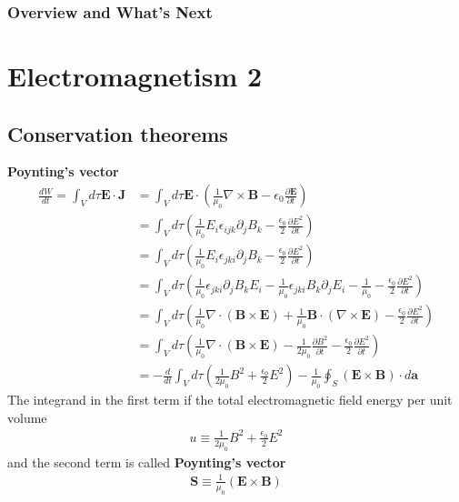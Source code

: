\documentclass[a4paper]{article}
\begin{document}
    \subsubsection{Overview and What's Next}

    \section{Electromagnetism 2}
    \subsection{Conservation theorems}

    \textbf{Poynting's vector} 
    \begin{align*}
        \frac{dW}{dt} = \int_V d \tau \mathbf{E} \cdot \mathbf{J} &= \int_V d \tau \mathbf{E} \cdot \left( \frac{1}{\mu_0} \nabla \times \mathbf{B} - \epsilon_0 \frac{\partial \mathbf{E}}{\partial t}\right) \\
        &= \int _V d \tau \left( \frac{1}{\mu _0} E_i \epsilon_{ijk} \partial_j B_k - \frac{\epsilon_0}{2} \frac{\partial E^{2} }{\partial t} \right) \\
        &= \int _V d \tau \left( \frac{1}{\mu _0}E_i\epsilon _{jki}\partial _j B_k  -  \frac{\epsilon_0}{2} \frac{\partial E^{2} }{\partial t}\right) \\
        &= \int _V d \tau \left( \frac{1}{\mu _0}\epsilon _{jki} \partial _j B_k E_i - \frac{1}{\mu _0} \epsilon_{jki} B_k\partial_j E_i - \frac{1}{\mu _0}  -  \frac{\epsilon_0}{2} \frac{\partial E^{2} }{\partial t}\right)\\
        &= \int _V d \tau \left( \frac{1}{\mu _0} \nabla \cdot (\mathbf{B} \times \mathbf{E}) + \frac{1}{\mu _0} \mathbf{B}\cdot (\nabla \times \mathbf{E})  -  \frac{\epsilon_0}{2} \frac{\partial E^{2} }{\partial t}\right)\\
        &= \int _V d \tau \left( \frac{1}{\mu _0} \nabla \cdot (\mathbf{B} \times \mathbf{E}) - \frac{1}{2\mu _0} \frac{\partial B^{2} }{\partial t}   -  \frac{\epsilon_0}{2} \frac{\partial E^{2} }{\partial t}\right)\\
        &= - \frac{d}{dt} \int_V d \tau \left( \frac{1}{2\mu _0} B^{2} + \frac{\epsilon_0}{2} E^{2}  \right) - \frac{1}{\mu _0}\oint_S \left(\mathbf{E} \times \mathbf{B} \right)  \cdot d \mathbf{a}
    \end{align*}
    The integrand in the first term if the total electromagnetic field energy per unit volume \begin{align*}
        u \equiv \frac{1}{2 \mu _0} B^{2}  + \frac{\epsilon_0}{2} E^{2} 
    \end{align*}
    and the second term is called \textbf{Poynting's vector} \begin{align*}
        \boxed{\mathbf{S} \equiv \frac{1}{\mu_0} \left(\mathbf{E} \times \mathbf{B} \right)}
    \end{align*} 
\end{document}
